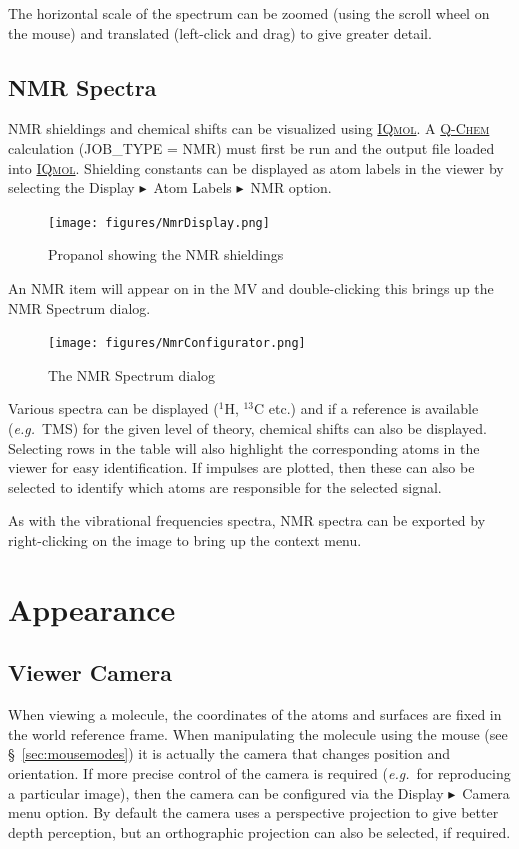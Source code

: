 \documentclass[a4paper,12pt]{article}
\newcommand{\qchem}{\href{http://q-chem.com}{{\scshape Q-Chem}}}
\newcommand{\iqmol}{\href{http://iqmol.org}{{\scshape IQmol}}}
\newcommand{\bt}{\ensuremath{\blacktriangleright}}
\newcommand{\eg}{\emph{e.g.}}
\begin{document}
The horizontal scale of the spectrum can be zoomed (using the scroll wheel on
the mouse) and translated (left-click and drag) to give greater detail.


\subsection{NMR Spectra}

NMR shieldings and chemical shifts can be visualized using \iqmol{}.  A 
\qchem{} calculation (JOB\_TYPE = NMR) must first be run and the output
file loaded into \iqmol{}.  Shielding constants can be displayed as atom labels
in the viewer by selecting the Display \bt\ Atom Labels \bt\ NMR option.
\begin{figure}[h]
\begin{center}
\texttt{[image: figures/NmrDisplay.png]}
\caption{Propanol showing the NMR shieldings}
\end{center}
\end{figure}

\newpage
An NMR item will appear on in the MV and double-clicking this brings up the NMR
Spectrum dialog.
\begin{figure}[h]
\begin{center}
\texttt{[image: figures/NmrConfigurator.png]}
\caption{The NMR Spectrum dialog}
\end{center}
\end{figure}

Various spectra can be displayed ($^1$H, $^{13}$C etc.) and if 
a reference is available (\eg\ TMS) for the given level of theory, 
chemical shifts can also be displayed.  Selecting rows in the table
will also highlight the corresponding atoms in the viewer for easy
identification.  If impulses are plotted, then these can also be selected
to identify which atoms are responsible for the selected signal.

As with the vibrational frequencies spectra, NMR spectra can be exported
by right-clicking on the image to bring up the context menu.


\newpage
\section{Appearance}

\subsection{Viewer Camera}

When viewing a molecule, the coordinates of the atoms and surfaces are fixed in
the world reference frame.  When manipulating the molecule using the mouse (see
\S\ \ref{sec:mousemodes}) it is actually the camera that changes position and
orientation.  If more precise control of the camera is required (\eg\ for
reproducing a particular image), then the camera can be configured via the
Display \bt\ Camera menu option.  By default the camera uses a perspective
projection to give better depth perception, but an orthographic projection can
also be selected, if required.
\end{document}
